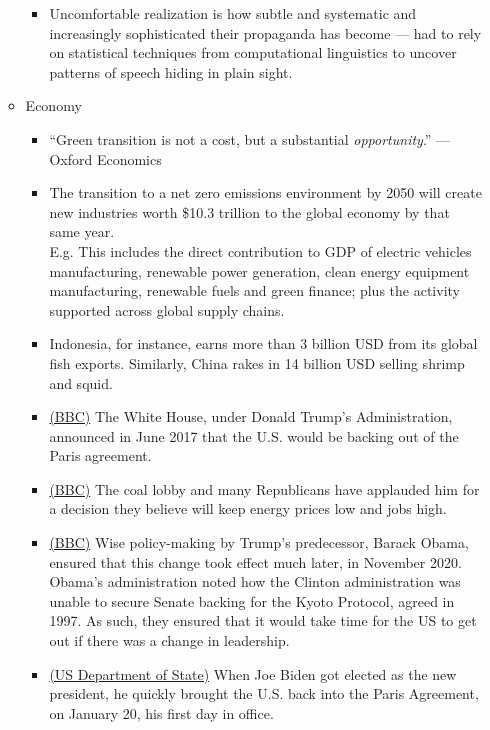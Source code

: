 \documentclass[oneside]{book}
\begin{document}
\begin{enumerate}
\begin{itemize}
\begin{itemize}
                \item Uncomfortable realization is how subtle and systematic and increasingly sophisticated their propaganda has become --- had to rely on statistical techniques from computational linguistics to uncover patterns of speech hiding in plain sight.
        \end{itemize} 
        \item Economy
        \begin{itemize}
            \item ``Green transition is not a cost, but a substantial \emph{opportunity}.'' --- Oxford Economics
            \item The transition to a net zero emissions environment by 2050 will create new industries worth 
            \$10.3 trillion to the global economy by that same year.\\
            \footnotesize E.g. This includes the direct contribution to GDP of electric 
            vehicles manufacturing, renewable power generation, 
            clean energy equipment manufacturing, renewable fuels 
            and green finance; plus the activity supported across 
            global supply chains. \normalsize
            \item Indonesia, for instance, earns more than 3 billion USD from its global fish exports. Similarly, China rakes in 14 billion USD selling shrimp and squid.
            \item \href{https://www.bbc.com/news/science-environment-54797743}{(BBC)} The White House, under Donald Trump's Administration, announced in June 2017 that the U.S. would be backing out of the Paris agreement.
            \item \href{https://www.bbc.com/news/live/world-us-canada-40123293?src_origin=BBCS_BBC}{(BBC)} The coal lobby and many Republicans have applauded him for a decision they believe will keep energy prices low and jobs high.
            \item \href{https://www.bbc.com/news/science-environment-54797743}{(BBC)} Wise policy-making by Trump's predecessor, Barack Obama, ensured that this change took effect much later, in November 2020. Obama's administration noted how the Clinton administration was unable to secure Senate backing for the Kyoto Protocol, agreed in 1997. As such, they ensured that it would take time for the US to get out if there was a change in leadership.
            \item \href{https://www.state.gov/the-united-states-officially-rejoins-the-paris-agreement/}{(US Department of State)} When Joe Biden got elected as the new president, he quickly brought the U.S. back into the Paris Agreement, on January 20, his first day in office. 

\end{itemize}
\end{itemize}
\end{enumerate}
\end{document}
